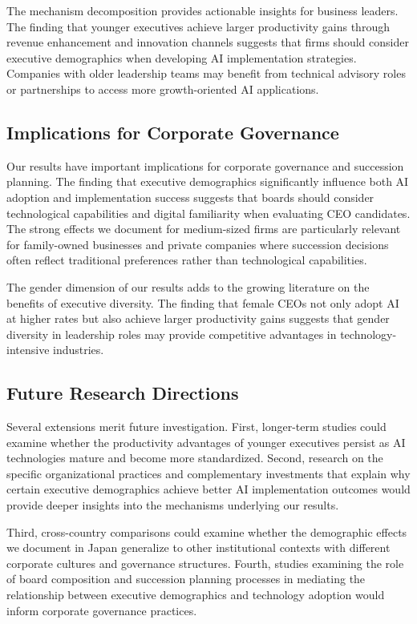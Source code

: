 \documentclass[12pt, a4paper]{article}
\begin{document}
The mechanism decomposition provides actionable insights for business leaders. The finding that younger executives achieve larger productivity gains through revenue enhancement and innovation channels suggests that firms should consider executive demographics when developing AI implementation strategies. Companies with older leadership teams may benefit from technical advisory roles or partnerships to access more growth-oriented AI applications.

\subsection{Implications for Corporate Governance}

Our results have important implications for corporate governance and succession planning. The finding that executive demographics significantly influence both AI adoption and implementation success suggests that boards should consider technological capabilities and digital familiarity when evaluating CEO candidates. The strong effects we document for medium-sized firms are particularly relevant for family-owned businesses and private companies where succession decisions often reflect traditional preferences rather than technological capabilities.

The gender dimension of our results adds to the growing literature on the benefits of executive diversity. The finding that female CEOs not only adopt AI at higher rates but also achieve larger productivity gains suggests that gender diversity in leadership roles may provide competitive advantages in technology-intensive industries.

\subsection{Future Research Directions}

Several extensions merit future investigation. First, longer-term studies could examine whether the productivity advantages of younger executives persist as AI technologies mature and become more standardized. Second, research on the specific organizational practices and complementary investments that explain why certain executive demographics achieve better AI implementation outcomes would provide deeper insights into the mechanisms underlying our results.

Third, cross-country comparisons could examine whether the demographic effects we document in Japan generalize to other institutional contexts with different corporate cultures and governance structures. Fourth, studies examining the role of board composition and succession planning processes in mediating the relationship between executive demographics and technology adoption would inform corporate governance practices.
\end{document}
